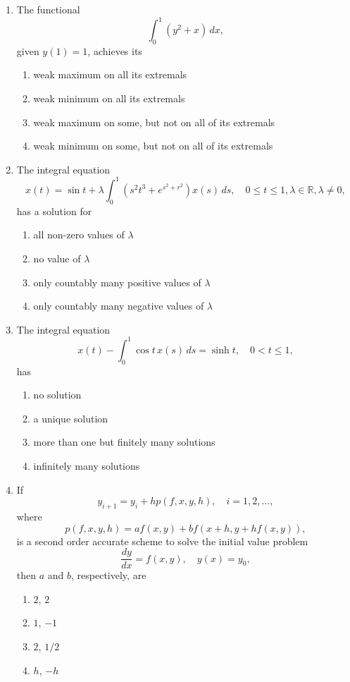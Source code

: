\documentclass[journal]{IEEEtran}
\numberwithin{equation}{enumi}
\numberwithin{figure}{enumi}
\begin{document}
\begin{enumerate}
\item
The functional 
\[
\int_0^1 (y^2 + x) \, dx,
\]
given $y(1) = 1$, achieves its
\hfill{}

\begin{enumerate}
    \item weak maximum on all its extremals
    \item weak minimum on all its extremals
    \item weak maximum on some, but not on all of its extremals
    \item weak minimum on some, but not on all of its extremals
\end{enumerate}


\item
The integral equation
\[
x(t) = \sin t + \lambda \int_0^1 (s^2 t^3 + e^{s^2 + r^2}) x(s) \, ds, \quad 0 \leq t \leq 1, \lambda \in \mathbb{R}, \lambda \neq 0,
\]
has a solution for
\hfill{}

\begin{enumerate}
    \item all non-zero values of $\lambda$
    \item no value of $\lambda$
    \item only countably many positive values of $\lambda$
    \item only countably many negative values of $\lambda$
\end{enumerate}


\item
The integral equation
\[
x(t) - \int_0^1 \cos t \, x(s) \, ds = \sinh t, \quad 0 < t \leq 1,
\]
has
\hfill{}

\begin{enumerate}
    \item no solution
    \item a unique solution
    \item more than one but finitely many solutions
    \item infinitely many solutions
\end{enumerate}


\item
If 
\[
y_{i+1} = y_i + h p(f,x,y,h), \quad i = 1,2,\ldots,
\]
where
\[
p(f,x,y,h) = a f(x,y) + b f(x+h, y + h f(x,y)),
\]
is a second order accurate scheme to solve the initial value problem
\[
\frac{dy}{dx} = f(x,y), \quad y(x) = y_0,
\]
then $a$ and $b$, respectively, are
\hfill{}
\begin{multicols}{4}
\begin{enumerate}
    \item $2$, $2$
    \item $1$, $-1$
    \item $2$, $1/2$
    \item $h$, $-h$
\end{enumerate}
\end{multicols}


\end{enumerate}
\end{document}

